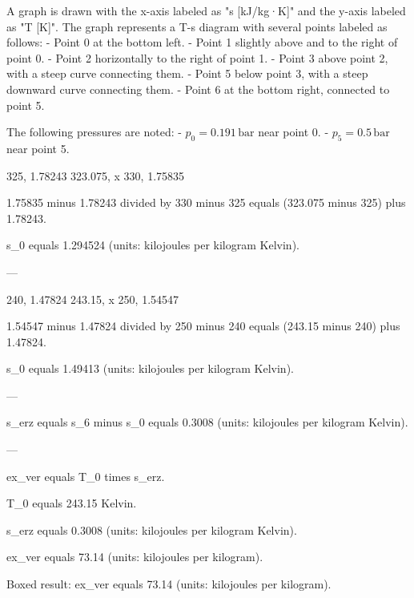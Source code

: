 A graph is drawn with the x-axis labeled as "s [kJ/kg·K]" and the y-axis labeled as "T [K]". The graph represents a T-s diagram with several points labeled as follows:  
- Point 0 at the bottom left.  
- Point 1 slightly above and to the right of point 0.  
- Point 2 horizontally to the right of point 1.  
- Point 3 above point 2, with a steep curve connecting them.  
- Point 5 below point 3, with a steep downward curve connecting them.  
- Point 6 at the bottom right, connected to point 5.  

The following pressures are noted:  
- \( p_0 = 0.191 \, \text{bar} \) near point 0.  
- \( p_5 = 0.5 \, \text{bar} \) near point 5.

325, 1.78243  
323.075, x  
330, 1.75835  

1.75835 minus 1.78243 divided by 330 minus 325 equals (323.075 minus 325) plus 1.78243.  

s_0 equals 1.294524 (units: kilojoules per kilogram Kelvin).  

---

240, 1.47824  
243.15, x  
250, 1.54547  

1.54547 minus 1.47824 divided by 250 minus 240 equals (243.15 minus 240) plus 1.47824.  

s_0 equals 1.49413 (units: kilojoules per kilogram Kelvin).  

---

s_erz equals s_6 minus s_0 equals 0.3008 (units: kilojoules per kilogram Kelvin).  

---

ex_ver equals T_0 times s_erz.  

T_0 equals 243.15 Kelvin.  

s_erz equals 0.3008 (units: kilojoules per kilogram Kelvin).  

ex_ver equals 73.14 (units: kilojoules per kilogram).  

Boxed result: ex_ver equals 73.14 (units: kilojoules per kilogram).